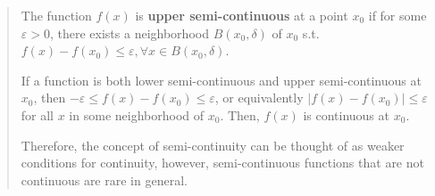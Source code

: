 \begin{quote}
  The function \( f(x) \) is \textbf{upper semi-continuous} at a point \( x_{0} \) if for
  some \( \varepsilon > 0 \), there exists a neighborhood \( B(x_{0}, \delta) \) of
  \( x_{0} \) s.t. \( f(x) - f(x_{0}) \le  \varepsilon, \forall x \in B(x_{0},
  \delta)\).

  If a function is both lower semi-continuous and upper semi-continuous at \( x_{0} \),
  then \(
  -\varepsilon \le  f(x) - f(x_{0}) \le  \varepsilon\), or equivalently \( |f(x)
  - f(x_{0})| \le  \varepsilon\) for all \( x \) in some
  neighborhood of \( x_{0} \). Then, \( f(x) \) is continuous at \( x_{0} \).

  Therefore, the concept of semi-continuity can be thought of as weaker
  conditions for continuity, however, semi-continuous functions that are not
  continuous are rare in general.
\end{quote}

